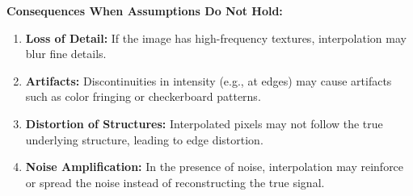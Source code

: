 \documentclass[11pt, a4]{article}
\begin{document}
\begin{enumerate}
\begin{enumerate}
			\textbf{Consequences When Assumptions Do Not Hold:}  
			\begin{enumerate}
				\item \textbf{Loss of Detail:} If the image has high-frequency textures, interpolation may blur fine details.  
				\item \textbf{Artifacts:} Discontinuities in intensity (e.g., at edges) may cause artifacts such as color fringing or checkerboard patterns.  
				\item \textbf{Distortion of Structures:} Interpolated pixels may not follow the true underlying structure, leading to edge distortion.  
				\item \textbf{Noise Amplification:} In the presence of noise, interpolation may reinforce or spread the noise instead of reconstructing the true signal.  
			\end{enumerate}
			

\end{enumerate}
\end{enumerate}
\end{document}
